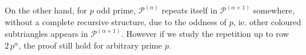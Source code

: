 On the other hand, for $p$ odd prime, $\mathcal{P}^{(\alpha)}$ repeats itself
in $\mathcal{P}^{(\alpha+1)}$ somewhere, without a complete recursive
structure, due to the oddness of $p$, ie. other coloured subtriangles appears
in $\mathcal{P}^{(\alpha+1)}$. However if we study the repetition up to row
$2\,p^{\alpha}$, the proof still hold for arbitrary prime $p$.

\iffalse
, while in general we can say that maximal
triangles of coefficients multiples of $p$, appear with regularity in
$\mathcal{P}_{n+1}$ a number of times equals to:
\begin{displaymath}
    \frac{(p-1)p}{2}
\end{displaymath}
in other words, considering triangles $\mathcal{P}_{n}$ and
$\mathcal{P}_{n+1}$, there are $\frac{(p-1)p}{2}$ upside-down
maximal triangles, with all coefficients multiple of $p$, from row $p^n$
to row $p^{n+1}-1$; this result will be prove at the end of this 
section.
\fi

